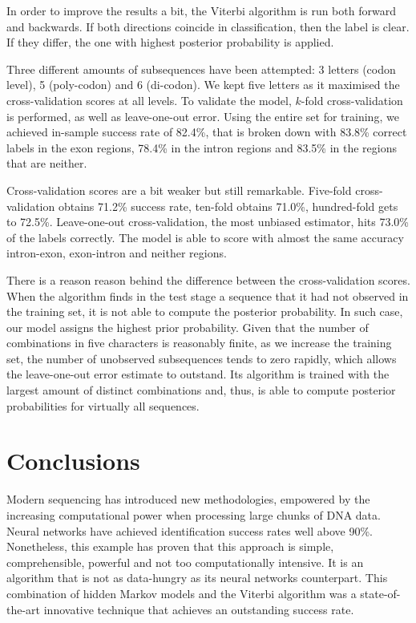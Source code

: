 \documentclass[a4paper, 11pt]{article} %
\begin{document}
In order to improve the results a bit, the Viterbi algorithm is run both forward and backwards. If both directions coincide in classification, then the label is clear. If they differ, the one with highest posterior probability is applied.

Three different amounts of subsequences have been attempted: 3 letters (codon level), 5 (poly-codon) and 6 (di-codon). We kept five letters as it maximised the cross-validation scores at all levels. To validate the model, $k$-fold cross-validation is performed, as well as leave-one-out error. Using the entire set for training, we achieved in-sample success rate of 82.4\%, that is broken down with 83.8\% correct labels in the exon regions, 78.4\% in the intron regions and 83.5\% in the regions that are neither.

Cross-validation scores are a bit weaker but still remarkable. Five-fold cross-validation obtains 71.2\% success rate, ten-fold obtains 71.0\%, hundred-fold gets to 72.5\%. Leave-one-out cross-validation, the most unbiased estimator, hits 73.0\% of the labels correctly. The model is able to score with almost the same accuracy intron-exon, exon-intron and neither regions.

There is a reason reason behind the difference between the cross-validation scores. When the algorithm finds in the test stage a sequence that it had not observed in the training set, it is not able to compute the posterior probability. In such case, our model assigns the highest prior probability. Given that the number of combinations in five characters is reasonably finite, as we increase the training set, the number of unobserved subsequences tends to zero rapidly, which allows the leave-one-out error estimate to outstand. Its algorithm is trained with the largest amount of distinct combinations and, thus, is able to compute posterior probabilities for virtually all sequences.



\section*{Conclusions}

Modern sequencing has introduced new methodologies, empowered by the increasing computational power when processing large chunks of DNA data. Neural networks have achieved identification success rates well above 90\%. Nonetheless, this example has proven that this approach is simple, comprehensible, powerful and not too computationally intensive. It is an algorithm that is not as data-hungry as its neural networks counterpart. This combination of hidden Markov models and the Viterbi algorithm was a state-of-the-art innovative technique that achieves an outstanding success rate.
\end{document}
